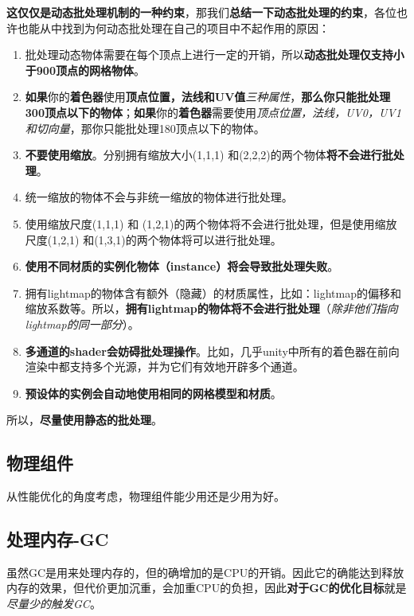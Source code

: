 \documentclass[UTF8,a4paper,12pt]{ctexart}
\begin{document}
  				\textbf{这仅仅是动态批处理机制的一种约束}，那我们\textbf{总结一下动态批处理的约束}，各位也许也能从中找到为何动态批处理在自己的项目中不起作用的原因：
  					\begin{enumerate}
		  				\item 批处理动态物体需要在每个顶点上进行一定的开销，所以\textbf{动态批处理仅支持小于900顶点的网格物体}。
		  				\item \textbf{如果}你的\textbf{着色器}使用\textbf{顶点位置，法线和UV值}\textit{三种属性}，\textbf{那么你只能批处理300顶点以下的物体}；\textbf{如果}你的\textbf{着色器}需要使用\textit{顶点位置，法线，UV0，UV1和切向量}，那你只能批处理180顶点以下的物体。
		  				\item \textbf{不要使用缩放}。分别拥有缩放大小(1,1,1) 和(2,2,2)的两个物体\textbf{将不会进行批处理}。
		  				\item 统一缩放的物体不会与非统一缩放的物体进行批处理。
		  				\item 使用缩放尺度(1,1,1) 和 (1,2,1)的两个物体将不会进行批处理，但是使用缩放尺度(1,2,1) 和(1,3,1)的两个物体将可以进行批处理。
		  				\item \textbf{使用不同材质的实例化物体（instance）将会导致批处理失败}。
		  				\item 拥有lightmap的物体含有额外（隐藏）的材质属性，比如：lightmap的偏移和缩放系数等。所以，\textbf{拥有lightmap的物体将不会进行批处理}（\textit{除非他们指向lightmap的同一部分}）。
		  				\item \textbf{多通道的shader会妨碍批处理操作}。比如，几乎unity中所有的着色器在前向渲染中都支持多个光源，并为它们有效地开辟多个通道。
		  				\item \textbf{预设体的实例会自动地使用相同的网格模型和材质}。
	  				\end{enumerate}
	  			
	  			所以，\textbf{尽量使用静态的批处理}。
	  			
	  	\subsection{物理组件}
	  		从性能优化的角度考虑，物理组件能少用还是少用为好。
	  		
	  	\subsection{处理内存-GC}
	  		虽然GC是用来处理内存的，但的确增加的是CPU的开销。因此它的确能达到释放内存的效果，但代价更加沉重，会加重CPU的负担，因此\textbf{对于GC的优化目标}就是\textit{尽量少的触发GC}。
	  		
\end{document}
